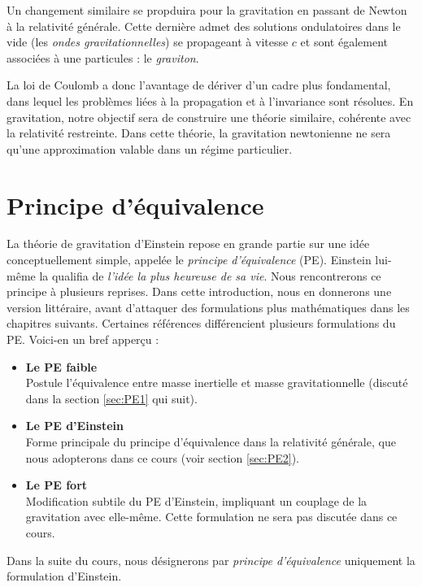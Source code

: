 \begin{rmk}
    Un changement similaire se propduira pour la gravitation en passant de Newton à la relativité générale. Cette dernière admet des solutions ondulatoires dans le vide (les \emph{ondes gravitationnelles}) se propageant à vitesse $c$ et sont également associées à une particules : le \emph{graviton}.
\end{rmk}
La loi de Coulomb a donc l'avantage de dériver d'un cadre plus fondamental, dans lequel les problèmes liées à la propagation et à l'invariance sont résolues. En gravitation, notre objectif sera de construire une théorie similaire, cohérente avec la relativité restreinte. Dans cette théorie, la gravitation newtonienne ne sera qu'une approximation valable dans un régime particulier.

\section{Principe d'équivalence}
La théorie de gravitation d'Einstein repose en grande partie sur une idée conceptuellement simple, appelée le \emph{principe d'équivalence} (PE). Einstein lui-même la qualifia de \emph{l'idée la plus heureuse de sa vie}. Nous rencontrerons ce principe à plusieurs reprises. Dans cette introduction, nous en donnerons une version littéraire, avant d'attaquer des formulations plus mathématiques dans les chapitres suivants. Certaines références différencient plusieurs formulations du PE. Voici-en un bref apperçu :
\begin{itemize}
    \item \textbf{Le PE faible} \\
    Postule l'équivalence entre masse inertielle et masse gravitationnelle (discuté dans la section \ref{sec:PE1} qui suit).\\
    \item \textbf{Le PE d'Einstein}\\
     Forme principale du principe d'équivalence dans la relativité générale, que nous adopterons dans ce cours (voir section \ref{sec:PE2}).\\
    \item \textbf{Le PE fort} \\
    Modification subtile du PE d'Einstein, impliquant un couplage de la gravitation avec elle-même. Cette formulation ne sera pas discutée dans ce cours.
\end{itemize}
Dans la suite du cours, nous désignerons par \emph{principe d'équivalence} uniquement la formulation d'Einstein.
